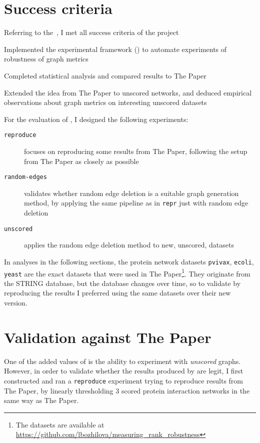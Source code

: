 \section{Success criteria}

Referring to the~, I met all success criteria of the project


\begin{todolist}
    \item[\done] Implemented the experimental framework (\graffs) to automate experiments of robustness of graph metrics
    \item[\done] Completed statistical analysis and compared results to The Paper
    \item[\done] Extended the idea from The Paper to unscored networks, and deduced empirical observations about graph metrics on interesting unscored datasets
\end{todolist}

For the evaluation of \graffs, I designed the following experiments:
\begin{description}
    \item[\texttt{reproduce}] focuses on reproducing some results from The Paper, following the setup from The Paper as closely as possible
    \item[\texttt{random-edges}] validates whether random edge deletion is a suitable graph generation method, by applying the same pipeline as in \texttt{repr} just with random edge deletion
    \item[\texttt{unscored}] applies the random edge deletion method to new, unscored, datasets
\end{description}

In analyses in the following sections, the protein network datasets \texttt{pvivax}, \texttt{ecoli}, \texttt{yeast} are the exact datasets that were used in The Paper\footnote{The datasets are available at \url{https://github.com/lbozhilova/measuring_rank_robustness}}.
They originate from the STRING database, but the database changes over time, so to validate \graffs by reproducing the results I preferred using the same datasets over their new version.


\section{Validation against The Paper}

One of the added values of \graffs is the ability to experiment with \textsl{unscored} graphs.
However, in order to validate whether the results produced by \graffs are legit, I first constructed and ran a \texttt{reproduce} experiment trying to reproduce results from The Paper, by linearly thresholding 3 scored protein interaction networks in the same way as The Paper.

